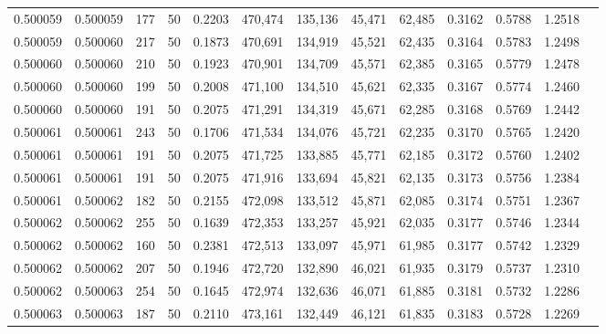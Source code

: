 \begin{tabular}{rrrrrrrrrrrrr}
0.500059 & 0.500059 &   177 &  50 &                                     0.2203 & 470,474 & 135,136 &  45,471 &  62,485 & 0.3162 & 0.5788 & 1.2518 \\
0.500059 & 0.500060 &   217 &  50 &                                     0.1873 & 470,691 & 134,919 &  45,521 &  62,435 & 0.3164 & 0.5783 & 1.2498 \\
0.500060 & 0.500060 &   210 &  50 &                                     0.1923 & 470,901 & 134,709 &  45,571 &  62,385 & 0.3165 & 0.5779 & 1.2478 \\
0.500060 & 0.500060 &   199 &  50 &                                     0.2008 & 471,100 & 134,510 &  45,621 &  62,335 & 0.3167 & 0.5774 & 1.2460 \\
0.500060 & 0.500060 &   191 &  50 &                                     0.2075 & 471,291 & 134,319 &  45,671 &  62,285 & 0.3168 & 0.5769 & 1.2442 \\
0.500061 & 0.500061 &   243 &  50 &                                     0.1706 & 471,534 & 134,076 &  45,721 &  62,235 & 0.3170 & 0.5765 & 1.2420 \\
0.500061 & 0.500061 &   191 &  50 &                                     0.2075 & 471,725 & 133,885 &  45,771 &  62,185 & 0.3172 & 0.5760 & 1.2402 \\
0.500061 & 0.500061 &   191 &  50 &                                     0.2075 & 471,916 & 133,694 &  45,821 &  62,135 & 0.3173 & 0.5756 & 1.2384 \\
0.500061 & 0.500062 &   182 &  50 &                                     0.2155 & 472,098 & 133,512 &  45,871 &  62,085 & 0.3174 & 0.5751 & 1.2367 \\
0.500062 & 0.500062 &   255 &  50 &                                     0.1639 & 472,353 & 133,257 &  45,921 &  62,035 & 0.3177 & 0.5746 & 1.2344 \\
0.500062 & 0.500062 &   160 &  50 &                                     0.2381 & 472,513 & 133,097 &  45,971 &  61,985 & 0.3177 & 0.5742 & 1.2329 \\
0.500062 & 0.500062 &   207 &  50 &                                     0.1946 & 472,720 & 132,890 &  46,021 &  61,935 & 0.3179 & 0.5737 & 1.2310 \\
0.500062 & 0.500063 &   254 &  50 &                                     0.1645 & 472,974 & 132,636 &  46,071 &  61,885 & 0.3181 & 0.5732 & 1.2286 \\
0.500063 & 0.500063 &   187 &  50 &                                     0.2110 & 473,161 & 132,449 &  46,121 &  61,835 & 0.3183 & 0.5728 & 1.2269 \\

\end{tabular}
